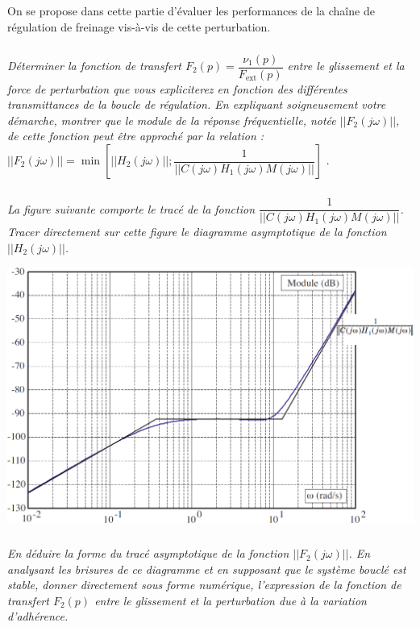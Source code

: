 \documentclass[10pt,fleqn]{article} %
\begin{document}
\begin{multicols}{2}
On se propose dans cette partie d’évaluer les performances de la chaîne de régulation de freinage vis-à-vis de cette perturbation.

\subparagraph{}\textit{Déterminer la fonction de transfert $F_2(p)=\dfrac{\nu_1(p)}{F_{\text{ext}}(p)}$ entre le glissement
et la force de perturbation que vous expliciterez en fonction des différentes
transmittances de la boucle de régulation. En expliquant soigneusement
votre démarche, montrer que le module de la réponse fréquentielle, notée $||F_2(j \omega)||$, de cette fonction peut être approché par la relation :
$||F_2(j \omega)|| = \min \left[ ||H_2(j \omega) || ; \dfrac{1}{||C(j\omega) H_1(j \omega) M(j\omega)||}\right]$ }.

\ifprof
\begin{corrige}
\end{corrige}
\else
\fi




\subparagraph{}\textit{La figure suivante comporte le tracé de la fonction $\dfrac{1}{||C(j\omega) H_1(j \omega) M(j\omega)||}$. Tracer
directement sur cette figure le diagramme asymptotique de la fonction $||H_2(j \omega) ||$.}

\begin{center}
\includegraphics[width=\linewidth]{images/Q12}
\end{center}


\ifprof
\begin{corrige}
\end{corrige}
\else
\fi



\subparagraph{}\textit{En déduire la forme du tracé asymptotique de la fonction $||F_2(j \omega) ||$. En analysant
les brisures de ce diagramme et en supposant que le système bouclé est
stable, donner directement sous forme numérique, l’expression de la fonction de
transfert $F_2(p)$ entre le glissement et la perturbation due à la
variation d’adhérence.}
\ifprof
\begin{corrige}
\end{corrige}
\else
\fi


\end{multicols}
\end{document}
